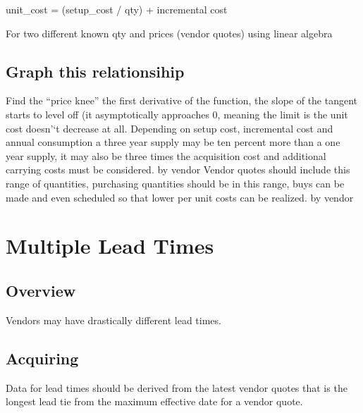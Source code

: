 \documentclass[letterpaper,10pt,english]{sphinxmanual}
\begin{document}
unit\_cost = (setup\_cost / qty) + incremental cost

For two different known qty and prices (vendor quotes) using linear
algebra


\section{Graph this relationsihip}
\label{Portal/300-UnitCost:graph-this-relationsihip}
Find the ``price knee'' the first derivative of the function, the slope of
the tangent starts to level off (it asymptotically approaches 0, meaning
the limit is the unit cost doesn'`t decrease at all. Depending on setup
cost, incremental cost and annual consumption a three year supply may be
ten percent more than a one year supply, it may also be three times the
acquisition cost and additional carrying costs must be considered.
by  vendor
Vendor quotes should include this range of quantities, purchasing
quantities should be in this range, buys can be made and even scheduled
so that lower per unit costs can be realized.
by  vendor


\chapter{Multiple Lead Times}
\label{Portal/400-MultipleLeadTimes:multiple-lead-times}\label{Portal/400-MultipleLeadTimes::doc}

\section{Overview}
\label{Portal/400-MultipleLeadTimes:overview}
Vendors may have drastically different lead times.


\section{Acquiring}
\label{Portal/400-MultipleLeadTimes:acquiring}
Data for lead times should be derived from the latest vendor quotes that is the longest lead tie from
the maximum effective date for a vendor quote.
\end{document}
